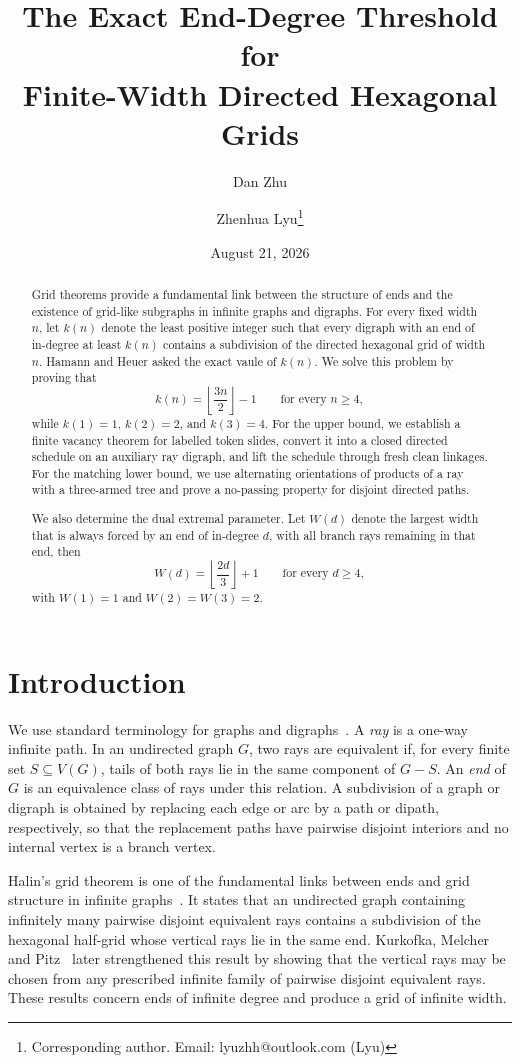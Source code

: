 \documentclass[11pt]{article}
\title{The Exact End-Degree Threshold for\\
Finite-Width Directed Hexagonal Grids}
\author[1]{Dan Zhu}
\author[2]{Zhenhua Lyu\thanks{Corresponding author. Email: lyuzhh@outlook.com (Lyu)}}
\affil[1]{School of Mathematical Sciences, Shenzhen University,
Shenzhen 518060, China}
\affil[2]{School of Science, Shenyang Aerospace University,
Shenyang 110136, China}
\date{August 21, 2026}
\theoremstyle{remark}
\numberwithin{equation}{section}
\begin{document}
\maketitle
{}
\vspace{-2.5em}

\begin{abstract}
Grid theorems provide a fundamental link between the structure of ends and the existence of grid-like subgraphs in infinite graphs and digraphs. For every fixed width $n$, let $k(n)$ denote the least positive integer such that every digraph with an end of in-degree at least $k(n)$ contains a subdivision of the directed hexagonal grid of width $n$. Hamann and Heuer asked the exact vaule of $k(n)$. We solve this problem by proving that
$$
k(n)=\left\lfloor\frac{3n}{2}\right\rfloor-1
\qquad\text{for every }n\geq4,
$$
while $k(1)=1$, $k(2)=2$, and $k(3)=4$. For the upper bound, we establish a finite vacancy theorem for labelled token slides, convert it into a closed directed schedule on an auxiliary ray digraph, and lift the schedule through fresh clean linkages. For the matching lower bound, we use alternating orientations of products of a ray with a three-armed tree and prove a no-passing property for disjoint directed paths. 

We also determine the dual extremal parameter. Let $W(d)$ denote the largest width that is always forced by an end of in-degree $d$, with all branch rays remaining in that end, then
$$W(d)=\left\lfloor\frac{2d}{3}\right\rfloor+1
\qquad\text{for every }d\geq4,$$
with $W(1)=1$ and $W(2)=W(3)=2$. 
\end{abstract}

\section{Introduction}

We use standard terminology for graphs and digraphs~\cite{BangJensenGutin,Diestel}. A \emph{ray} is a one-way infinite path. In an undirected graph $G$, two rays are equivalent if, for every finite set $S\subseteq V(G)$, tails of both rays lie in the same component of $G-S$. An \emph{end} of $G$ is an equivalence class of rays under this relation. A subdivision of a graph or digraph is obtained by replacing each edge or arc by a path or dipath, respectively, so that the replacement paths have pairwise disjoint interiors and no internal vertex is a branch vertex.

Halin's grid theorem is one of the fundamental links between ends and grid structure in infinite graphs~\cite{Halin}. It states that an undirected graph containing infinitely many pairwise disjoint equivalent rays contains a subdivision of the hexagonal half-grid whose vertical rays lie in the same end. Kurkofka, Melcher and Pitz~\cite{KurkofkaMelcherPitz} later strengthened this result by showing that the vertical rays may be chosen from any prescribed infinite family of pairwise disjoint equivalent rays. These results concern ends of infinite degree and produce a grid of infinite width.
\end{document}
